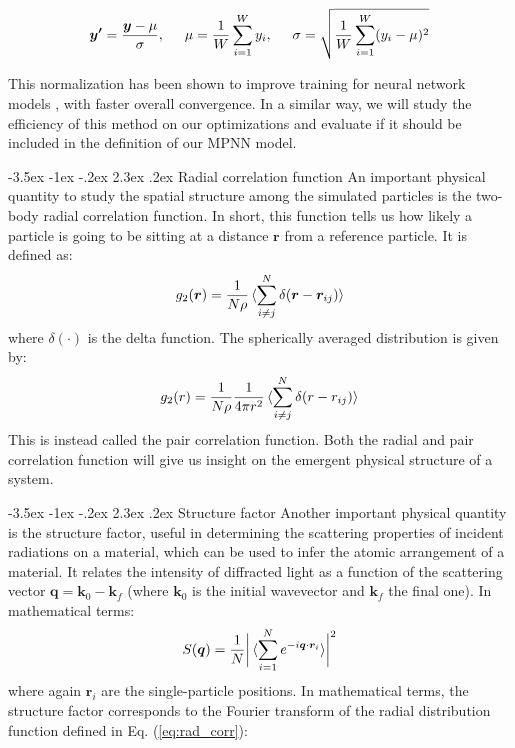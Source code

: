 \documentclass[a4paper, 12pt, oneside]{article}
\makeatletter
\renewcommand{\subsection}{\@startsection{subsection}{1}{\z@}%
             {-3.5ex \@plus-1ex \@minus-.2ex}%
             {2.3ex \@plus.2ex}%
             {\normalfont\normalsize\bfseries}}
\makeatother
\begin{document}
\begin{equation}
\bm{y'} = \dfrac{\bm{y}-\mu}{\sigma},\hspace{0.5cm}\mu = \dfrac{1}{W} \sum_{i=1}^W y_i,\hspace{0.5cm}
\sigma = \sqrt{\dfrac{1}{W}\sum_{i=1}^W(y_i-\mu)^2}
\end{equation}

This normalization has been shown to improve training for neural network models 
\cite{xu2019understanding}, with faster overall convergence. In a similar way, we will study the 
efficiency of this method on our optimizations and evaluate if it should be included in the definition 
of our MPNN model.

\subsection{Radial correlation function}
An important physical quantity to study the spatial structure among the simulated particles is the two-body radial correlation function. In short, this function tells us how 
likely a particle is going to be sitting at a distance $\bm{r}$ from a reference particle. It is defined as:
\begin{equation}\label{eq:rad_corr}
g_2(\bm{r}) = \dfrac{1}{N\rho}\braket{\sum_{i\neq j}^N\delta(\bm{r}-\bm{r}_{ij})}
\end{equation}
where $\delta(\cdot)$ is the delta function. The spherically averaged distribution is given by:
\begin{equation}\label{eq:pair_corr}
    g_2(r) = \dfrac{1}{N\rho}\dfrac{1}{4\pi r^2}\braket{\sum_{i\neq j}^N\delta(r-r_{ij})}
\end{equation} 
This is instead called the pair correlation function. Both the radial and pair correlation function will 
give us insight on the emergent physical structure of a system. 

\subsection{Structure factor}
Another important physical quantity is the structure factor, useful in determining the scattering 
properties of incident radiations on a material, which can be used to infer the atomic arrangement of a 
material. It relates the intensity of diffracted light as 
a function of the scattering vector $\bm{q} = \bm{k}_0 - \bm{k}_f$ (where $\bm{k}_0$ is the initial 
wavevector and $\bm{k}_f$ the final one). In mathematical terms:
\begin{equation}\label{eq:struct_factor}
    S(\bm{q}) = \dfrac{1}{N}\biggr|\braket{\sum_{i=1}^N e^{-i\bm{q} \cdot \bm{r}_i}}\biggr|^2
\end{equation}
where again $\bm{r}_i$ are the single-particle positions. In mathematical terms, the structure factor corresponds to the 
Fourier transform of the radial distribution function defined in Eq. (\ref{eq:rad_corr}):
\end{document}
